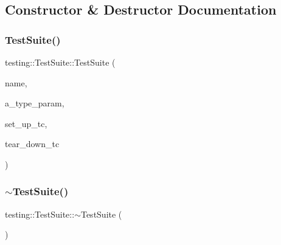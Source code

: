 \subsection{Constructor \& Destructor Documentation}
\mbox{\label{classtesting_1_1_test_suite_a2d6469bcb83701e1bbfe47c465e9731f}} 
\subsubsection{\texorpdfstring{TestSuite()}{TestSuite()}\hspace{0.1cm}{\footnotesize\ttfamily [1/2]}}
{\footnotesize\ttfamily testing\+::\+Test\+Suite\+::\+Test\+Suite (\begin{DoxyParamCaption}\item[{const char $\ast$}]{name,  }\item[{const char $\ast$}]{a\+\_\+type\+\_\+param,  }\item[{\mbox{\hyperlink{namespacetesting_1_1internal_a028e9455ad22171feabf84fe46329c92}{internal\+::\+Set\+Up\+Test\+Suite\+Func}}}]{set\+\_\+up\+\_\+tc,  }\item[{\mbox{\hyperlink{namespacetesting_1_1internal_ab58aba5acd47d329b72a1d10c7b61648}{internal\+::\+Tear\+Down\+Test\+Suite\+Func}}}]{tear\+\_\+down\+\_\+tc }\end{DoxyParamCaption})}

\mbox{\label{classtesting_1_1_test_suite_a5e884630add3c01712a3e63bef543c60}} 
\subsubsection{\texorpdfstring{$\sim$TestSuite()}{~TestSuite()}\hspace{0.1cm}{\footnotesize\ttfamily [1/2]}}
{\footnotesize\ttfamily testing\+::\+Test\+Suite\+::$\sim$\+Test\+Suite (\begin{DoxyParamCaption}{ }\end{DoxyParamCaption})\hspace{0.3cm}{\ttfamily [virtual]}}

\mbox{\label{classtesting_1_1_test_suite_a2d6469bcb83701e1bbfe47c465e9731f}} 
